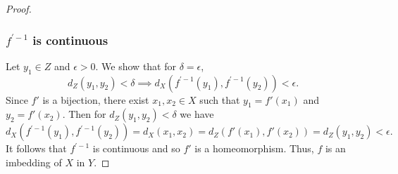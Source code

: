 \begin{solution}
\begin{proof}
    \subsubsection*{$f^{\prime -1}$ is continuous}
    Let $y_1 \in Z$ and $\epsilon > 0$.
    We show that for $\delta = \epsilon$,
    \begin{equation*}
      d_Z(y_1, y_2) < \delta \implies d_X(f^{\prime -1}(y_1), f^{\prime -1}(y_2)) < \epsilon.
    \end{equation*}
    Since $f'$ is a bijection, there exist $x_1, x_2 \in X$ such that $y_1 = f'(x_1)$ and $y_2 = f'(x_2)$.
    Then for $d_Z(y_1, y_2) < \delta$ we have
    \begin{equation*}
      d_X(f^{\prime -1}(y_1), f^{\prime -1}(y_2)) = d_X(x_1, x_2) = d_Z(f'(x_1), f'(x_2)) = d_Z(y_1, y_2) < \epsilon.
    \end{equation*}
    It follows that $f^{\prime -1}$ is continuous and so $f'$ is a homeomorphism.
    Thus, $f$ is an imbedding of $X$ in $Y$.
  \end{proof}
\end{solution}
\newpage

